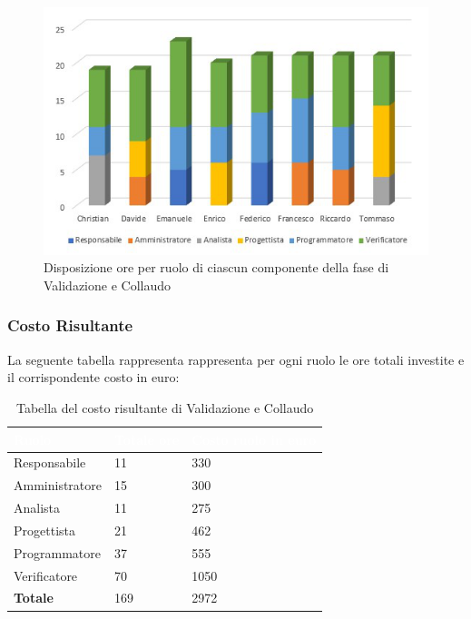 \begin{figure}[h!]
	\centering
	
	\includegraphics[scale=2.5]{Sezioni/Istogrammi/IstogrammaValidazione.png}
	\caption{Disposizione ore per ruolo di ciascun componente della fase di Validazione e Collaudo}
\end{figure}

\subsubsection{Costo Risultante}
La seguente tabella rappresenta rappresenta per ogni ruolo le ore totali investite e il corrispondente costo in euro:
{
	\renewcommand{\arraystretch}{2}

	
	\begin{longtable}[h!]	{ C{3cm} C{2cm} C{4cm}}
	\caption{Tabella del costo risultante di Validazione e Collaudo}\\
		\textcolor{white}{\textbf{Ruolo}} & 
		\textcolor{white}{\textbf{Totale ore}} & 
		\textcolor{white}{\textbf{Costo ruolo in euro}}\\	
		\endhead
        
        Responsabile & 11 & 330\\
        Amministratore & 15 & 300 \\
        Analista & 11 & 275\\
        Progettista & 21 & 462\\
        Programmatore & 37 & 555\\
        Verificatore & 70 & 1050\\
        \textbf{Totale} & 169 & 2972\
	
	\end{longtable}

	
}

